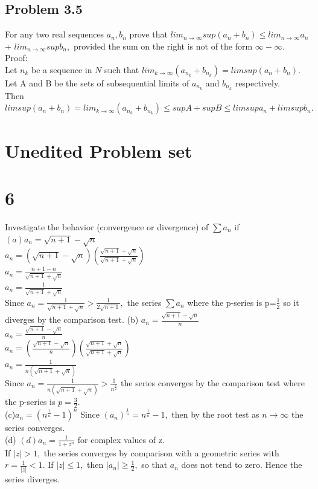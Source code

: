 \subsection*{Problem 3.5}
For any two real sequences ${a_n},{b_n}$ prove that $lim_{n \rightarrow \infty} sup(a_n +b_n)\leq lim_{n \rightarrow \infty}a_n$+ $lim_{n \rightarrow \infty}sup b_n,$ provided the sum on the right is not of the form $\infty-\infty.$\\ 
Proof: \\ 
Let ${n_k}$ be a sequence in $N$ such that $lim_{k \rightarrow \infty} (a_{n_k}+b_{n_k})=lim sup(a_n +b_n).$\\ 
Let A and B be the sets of subsequential limits of $a_{n_k}$ and $b_{n_k}$ respectively. \\ 
Then $lim sup (a_n +b_n)= lim_{k \rightarrow \infty} (a_{n_k}+b_{n_k}) \leq sup A+ sup B \leq lim sup a_n + lim sup b_n.$

\newpage
\section{Unedited Problem set}

\section*{6}
Investigate the behavior (convergence or divergence) of $\sum a_n$ if \\ 
$(a) a_n= \sqrt{n+1}-\sqrt{n}$\\ 
$a_n= (\sqrt{n+1}-\sqrt{n}) (\frac{\sqrt{n+1}+\sqrt{n}}{\sqrt{n+1}+\sqrt{n}})$
\\
$a_n= \frac{n+1-n}{\sqrt{n+1}+\sqrt{n}}$
\\
$a_n=\frac{1}{\sqrt{n+1}+\sqrt{n}}$
\\ 
Since $a_n=\frac{1}{\sqrt{n+1}+\sqrt{n}}>\frac{1}{2\sqrt{n+1}},$ the series $\sum a_n$ where the p-series is p=$\frac{1}{2}$ so it diverges by the comparison test. 
(b) $a_n= \frac{\sqrt{n+1}-\sqrt{n}}{n}$
\\ 
$a_n=\frac{\sqrt{n+1}-\sqrt{n}}{n}$ 
\\
$a_n= (\frac{\sqrt{n+1}-\sqrt{n}}{n})(\frac{\sqrt{n+1} +\sqrt{n}}{\sqrt{n+1}+\sqrt{n}})$ \\

$a_n = \frac{1}{n(\sqrt{n+1}+\sqrt{n})}$
\\ 
Since $a_n = \frac{1}{n(\sqrt{n+1}+\sqrt{n})}>\frac{1}{n^\frac{3}{2}}$ the series converges by the comparison test where the p-series is $p=\frac{3}{2}.$
\\
(c)$a_n=(n^\frac{1}{n}-1)^n$
Since $(a_n)^\frac{1}{n}=n^\frac{1}{n}-1,$ then by the root test as $n \longrightarrow \infty$ the series converges. \\ 
(d)
$(d) a_n = \frac{1}{1+z^n}$ for complex values of z. \\ 
If $|z|>1,$ the series converges by comparison with a geometric series with $r= \frac{1}{|z|}<1.$ If $|z|\leq 1,$ then $|a_n| \geq \frac{1}{2},$ so that $a_n$ does not tend to zero. Hence the series diverges. 

